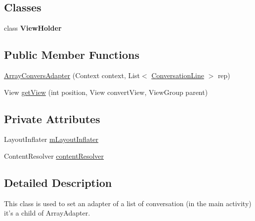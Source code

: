 \subsection*{Classes}
\begin{DoxyCompactItemize}
\item 
class {\bfseries View\+Holder}
\end{DoxyCompactItemize}
\subsection*{Public Member Functions}
\begin{DoxyCompactItemize}
\item 
\hyperlink{a00003_a6c4aeef04be96ad661e6cb67f4f192cf}{Array\+Convers\+Adapter} (Context context, List$<$ \hyperlink{a00009}{Conversation\+Line} $>$ rep)
\item 
View \hyperlink{a00003_af6292d542d7937de5b4044234a2db905}{get\+View} (int position, View convert\+View, View\+Group parent)
\end{DoxyCompactItemize}
\subsection*{Private Attributes}
\begin{DoxyCompactItemize}
\item 
Layout\+Inflater \hyperlink{a00003_a4e02ab86d39fcfd990b8dd2f36ccc3c9}{m\+Layout\+Inflater}
\item 
Content\+Resolver \hyperlink{a00003_a261822b570bfffa0c90ead212414c9b6}{content\+Resolver}
\end{DoxyCompactItemize}


\subsection{Detailed Description}
This class is used to set an adapter of a list of conversation (in the main activity) it's a child of Array\+Adapter. 

